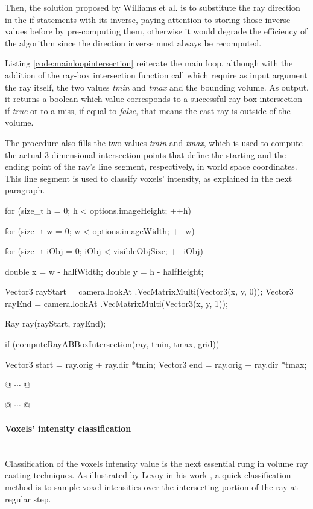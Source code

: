 \documentclass[12pt,a4paper]{extarticle}
\newcommand{\linespace}{\vspace{0pt}}
\newcommand{\myparagraph}[1]{\paragraph{#1}\mbox{}\\}
\begin{document}
Then, the solution proposed by Williams et al. \cite{Williams:2005} is to substitute the ray direction in the if statements with its inverse, paying attention to storing those inverse values before by pre-computing them, otherwise it would degrade the efficiency of the algorithm since the direction inverse must always be recomputed. 
\linespace 

Listing \ref{code:mainloopintersection} reiterate the main loop, although with the addition of the ray-box intersection function call which require as input argument the ray itself, the two values \textit{tmin} and \textit{tmax} and the bounding volume. As output, it returns a boolean which value corresponds to a successful ray-box intersection if \emph{true} or to a miss, if equal to \emph{false}, that means the cast ray is outside of the volume.

The procedure also fills the two values \textit{tmin} and \textit{tmax}, which is used to compute the actual 3-dimensional intersection points that define the starting and the ending point of the ray's line segment, respectively, in world space coordinates.
This line segment is used to classify voxels' intensity, as explained in the next paragraph.

\begin{cpp}[caption={Ray casting main loop enriched with ray-box intersection checking statement and ray starting and ending points},label=code:mainloopintersection]
for (size_t h = 0; h < options.imageHeight; ++h) {
	for (size_t w = 0; w < options.imageWidth; ++w) {
		for (size_t iObj = 0; iObj < visibleObjSize; ++iObj) {
			double x = w - halfWidth;
			double y = h - halfHeight;

			Vector3 rayStart = camera.lookAt
						.VecMatrixMulti(Vector3(x, y, 0));
			Vector3 rayEnd = camera.lookAt
						.VecMatrixMulti(Vector3(x, y, 1));

			Ray ray(rayStart, rayEnd);

			if (computeRayABBoxIntersection(ray, tmin, tmax, grid)) {
				Vector3 start = ray.orig + ray.dir *tmin;
				Vector3 end = ray.orig + ray.dir *tmax;
				
				@ $\cdots$ @
			}
			@ $\cdots$ @
		}
	}
}
\end{cpp}
\myparagraph{Voxels' intensity classification} Classification of the voxels intensity value is the next essential rung in volume ray casting techniques. As illustrated by Levoy in his work \cite{levoy_1988:4}, a quick classification method is to sample voxel intensities over the intersecting portion of the ray at regular step.
\end{document}
